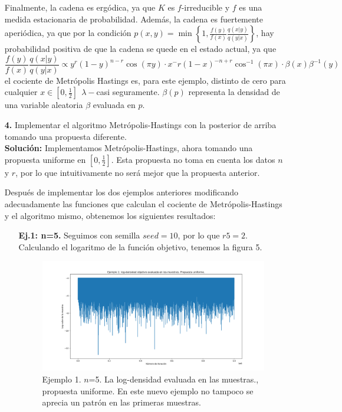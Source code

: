 \documentclass[letterpaper]{article}
\newcommand{\1}{\mathds{1}}
\theoremstyle{definition}
\theoremstyle{definition}
\theoremstyle{definition}
\theoremstyle{definition}
\theoremstyle{definition}
\begin{document}
\begin{enumerate}
    Finalmente, la cadena es ergódica, ya que $K$ es $f$-irreducible y $f$ es una medida estacionaria de probabilidad.
    Además, la cadena es fuertemente aperiódica, ya que por la condición $p(x,y)=\min \left\{1,\frac{f(y)}{f(x)}\frac{q(x|y)}{q(y|x)}\right\}$,
    hay probabilidad positiva de que la cadena se quede en el estado actual, ya que 
    \[
        \frac{f(y)}{f(x)}\frac{q(x|y)}{q(y|x)}\propto y^r(1-y)^{n-r}\cos(\pi y)\cdot x^-r(1-x)^{-n+r}\cos^{-1}(\pi x)\cdot \beta(x) \beta^{-1}(y) 
    \]
    el cociente de Metrópolis Hastings es, para este ejemplo, distinto de cero para cualquier $x\in [0,\frac{1}{2}] \ \ \lambda-$casi seguramente. $\beta(p)$ 
    representa la densidad de una variable aleatoria $\beta$ evaluada en $p$.

    \item[\textbf{4.}] Implementar el algoritmo Metrópolis-Hastings con la posterior de arriba 
    tomando una propuesta diferente.\\

    \textbf{Solución:} Implementamos Metrópolis-Hastings, ahora tomando una propuesta uniforme en $[0,\frac{1}{2}]$. Esta propuesta 
    no toma en cuenta los datos $n$ y $r$, por lo que intuitivamente no será mejor que la propuesta anterior.
    \newline

    Después de implementar los dos ejemplos anteriores modificando adecuadamente las funciones que calculan el cociente de Metrópolis-Hastings 
    y el algoritmo mismo, obtenemos los siguientes resultados:
    \begin{itemize}
        \item[\textbf{Ej.1: n=5.}] Seguimos con semilla $seed=10$, por lo que $r5=2$.\\

        Calculando el logaritmo de la función objetivo, tenemos la figura 5.

        \begin{figure}[h!]
            \centering
            \includegraphics[width=\linewidth]{5.png}
            \caption{Ejemplo 1. $n$=5. La log-densidad evaluada en las muestras., propuesta uniforme. En este nuevo ejemplo no tampoco se aprecia un patrón en las primeras muestras.}
        \end{figure} 


\end{itemize}
\end{enumerate}
\end{document}
